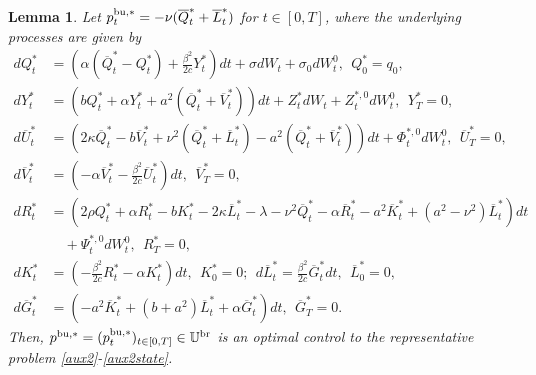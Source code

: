 \documentclass[11pt]{article}
\newtheorem{lemma}{Lemma}[section]
\numberwithin{equation}{section}
\begin{document}
\begin{lemma}\label{prop4.2}
Let $p_t^{{\rm bu},*}=-\nu (\overline{Q}_t^*+\overline{L}_t^*)$ for $t\in[0,T]$, where the underlying processes are given by
\begin{align}\label{fbsde4.3}
dQ_t^*&=\left(\alpha(\overline{Q}_t^*-Q_t^*)+\frac{\beta^2}{2c}Y_t^*\right)dt+\sigma dW_t+\sigma_0dW_t^0,~~Q_0^*=q_0,\nonumber\\ dY_t^*&=\left(bQ_t^*+\alpha Y_t^*+a^2(\overline{Q}_t^*+\overline{V}_t^*)\right)dt+Z_t^*dW_t+Z_t^{*,0}dW_t^0,~~ Y_T^*=0,\nonumber\\
d\overline{U}_t^*&=\left(2\kappa \overline{Q}_t^*-b\overline{V}_t^*+\nu^2 (\overline{Q}_t^*+\overline{L}_t^*)-a^2(\overline{Q}_t^*+\overline{V}_t^*)\right)dt+\Phi_t^{*,0}dW_t^0,~~ \overline{U}_T^*=0,\nonumber\\
d\overline{V}_t^*&=\left(-\alpha \overline{V}_t^*-\frac{\beta^2}{2c}\overline{U}_t^*\right)dt,~~\overline{V}_T^*=0,\\
dR_t^*&=\left(2\rho Q_t^*+\alpha R_t^*-bK_t^*-2\kappa \overline{L}_t^*-\lambda -\nu^2\overline{Q}_t^*-\alpha \overline{R}_t^*-a^2\overline{K}_t^*+(a^2-\nu^2)\overline{L}_t^*\right)dt\nonumber\\
&\quad+\Psi_t^{*,0}dW_t^0,~~R_T^*=0,\nonumber\\
dK_t^*&=\left(-\frac{\beta^2}{2c}R_t^*-\alpha K_t^*\right)dt,~~K_0^*=0;~~d\overline{L}_t^*=\frac{\beta^2}{2c}\overline{G}_t^*dt,~~\overline{L}_0^*=0,\nonumber\\
d\overline{G}_t^*&=(-a^2\overline{K}_t^*+(b+a^2)\overline{L}_t^*+\alpha \overline{G}_t^*)dt,~~\overline{G}_T^*=0.\nonumber
\end{align}
Then, $p^{{\rm bu},*}=(p_t^{{\rm bu},*})_{t\in[0,T]}\in\mathbb{U}^{\rm br}$ is an optimal control to the representative problem \eqref{aux2}-\eqref{aux2state}.
\end{lemma}
\end{document}
